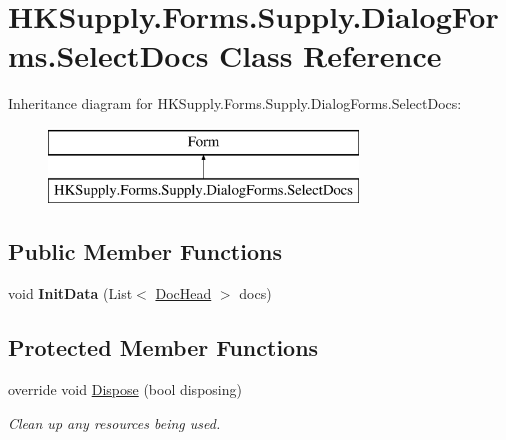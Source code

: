 \hypertarget{class_h_k_supply_1_1_forms_1_1_supply_1_1_dialog_forms_1_1_select_docs}{}\section{H\+K\+Supply.\+Forms.\+Supply.\+Dialog\+Forms.\+Select\+Docs Class Reference}
\label{class_h_k_supply_1_1_forms_1_1_supply_1_1_dialog_forms_1_1_select_docs}
Inheritance diagram for H\+K\+Supply.\+Forms.\+Supply.\+Dialog\+Forms.\+Select\+Docs\+:\begin{figure}[H]
\begin{center}
\leavevmode
\includegraphics[height=2.000000cm]{class_h_k_supply_1_1_forms_1_1_supply_1_1_dialog_forms_1_1_select_docs}
\end{center}
\end{figure}
\subsection*{Public Member Functions}
\begin{DoxyCompactItemize}
\item 
\mbox{\label{class_h_k_supply_1_1_forms_1_1_supply_1_1_dialog_forms_1_1_select_docs_a2c13b073ff6f1bf9e8a06d6b81574c4f}} 
void {\bfseries Init\+Data} (List$<$ \mbox{\hyperlink{class_h_k_supply_1_1_models_1_1_supply_1_1_doc_head}{Doc\+Head}} $>$ docs)
\end{DoxyCompactItemize}
\subsection*{Protected Member Functions}
\begin{DoxyCompactItemize}
\item 
override void \mbox{\hyperlink{class_h_k_supply_1_1_forms_1_1_supply_1_1_dialog_forms_1_1_select_docs_a423e6dcbeea397645b09a00db21952a4}{Dispose}} (bool disposing)
\begin{DoxyCompactList}\small\item\em Clean up any resources being used. \end{DoxyCompactList}\end{DoxyCompactItemize}
